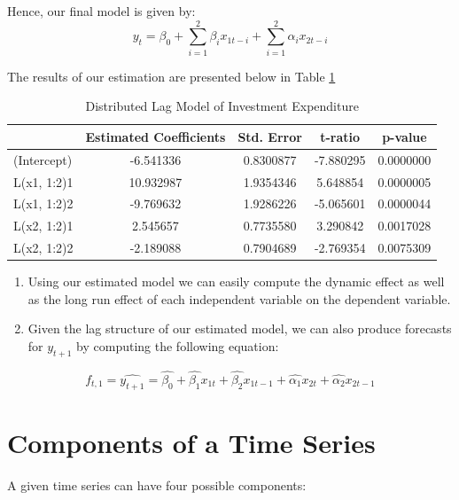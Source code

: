 \documentclass[]{book}
\theoremstyle{definition}
\theoremstyle{definition}
\theoremstyle{definition}
\theoremstyle{remark}
\begin{document}
Hence, our final model is given by:
\begin{equation}
y_t= \beta_0 + \sum_{i=1}^2\beta_i x_{1t-i}+\sum_{i=1}^2\alpha_i x_{2t-i}
\end{equation}

The results of our estimation are presented below in Table \ref{tab:ch2-table3}

\begin{table}[t]

\caption{\label{tab:ch2-table3}Distributed Lag Model of Investment Expenditure}
\centering
\begin{tabular}{lcccc}
\toprule
  & Estimated Coefficients & Std. Error & t-ratio & p-value\\
\midrule
(Intercept) & -6.541336 & 0.8300877 & -7.880295 & 0.0000000\\
L(x1, 1:2)1 & 10.932987 & 1.9354346 & 5.648854 & 0.0000005\\
L(x1, 1:2)2 & -9.769632 & 1.9286226 & -5.065601 & 0.0000044\\
L(x2, 1:2)1 & 2.545657 & 0.7735580 & 3.290842 & 0.0017028\\
L(x2, 1:2)2 & -2.189088 & 0.7904689 & -2.769354 & 0.0075309\\
\bottomrule
\end{tabular}
\end{table}

\begin{enumerate}
\def\labelenumi{\arabic{enumi}.}
\item
  Using our estimated model we can easily compute the dynamic effect as well as the long run effect of each independent variable on the dependent variable.
\item
  Given the lag structure of our estimated model, we can also produce forecasts for \(y_{t+1}\) by computing the following equation:
\end{enumerate}

\begin{equation}
f_{t,1}=\widehat{y_{t+1}}=\hat{\beta_0}+\hat{\beta_1}x_{1t} + \hat{\beta_2}x_{1t-1}+ \hat{\alpha_1}x_{2t}+\hat{\alpha_2}x_{2t-1}
\end{equation}

\hypertarget{components-of-a-time-series}{%
\chapter{Components of a Time Series}\label{components-of-a-time-series}}

A given time series can have four possible components:
\end{document}
